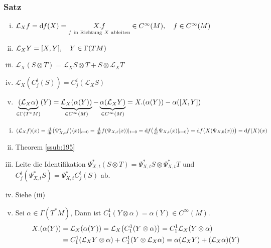 \subsubsection[Satz:Eigenschaften von $\mathcal{L}_X$]{Satz}
\label{ssub:186}
\begin{enumerate}[(i)]
\item $\mathcal{L}_X f = \mathrm{d}\mkern-1.0mu f(X) = \underset{f\text{ in Richtung }X\text{ ableiten}}{X. f} \in C^\infty(M),\quad f\in C^\infty (M)$
\item $\mathcal{L}_X Y = [X,Y],\quad Y\in \Gamma(TM)$
\item $\mathcal{L}_X (S\otimes T) = \mathcal{L}_X S \otimes T + S\otimes \mathcal{L}_X T$
\item $\mathcal{L}_X(C_j^i(S)) = C_j^i(\mathcal{L}_X S)$
\item $\underbrace{(\mathcal{L}_X \alpha)}_{\in \Gamma(T^* M)}(Y) = \underbrace{\mathcal{L}_X(\alpha(Y))}_{\in C^\infty (M)} - \underbrace{\alpha(\mathcal{L}_X Y)}_{\in C^\infty (M)} = X.(\alpha(Y)) - \alpha([X,Y])$
\end{enumerate}
\begin{enumerate}[(i)]
\item $\enbrace*{\mathcal{L}_X f}(x) = \frac{\mathd}{\mathd t}\enbrace*{\Psi_{X,t}^* f}(x)\vert_{t = 0} = \frac{\mathd}{\mathd t} f\enbrace*{\Psi_{X,t}(x)}\vert_{t = 0} = \mathd f\enbrace*{\frac{\mathd}{\mathd t} \Psi_{X,t}(x)\vert_{t = 0}} = \mathd f\enbrace[\big]{X\enbrace*{\Psi_{X,0}(x)}} = \mathd f(X)(x)$
\item Theorem \ref{ssub:195}
\item Leite die Identifikation $\Psi_{X,t}^*(S\otimes T) = \Psi_{X,t}^* S \otimes \Psi_{X,t}^* T$ und $C_j^i(\Psi_{X,t}^* S) = \Psi_{X,t}^* C_j^i(S)$ ab.
\item Siehe (iii)
\item Sei $\alpha\in \Gamma(T^* M)$, Dann ist $C_1^1(Y\otimes \alpha) = \alpha(Y) \in C^\infty (M)$.
\begin{align*}
X.(\alpha(Y)) &= \mathcal{L}_X (\alpha(Y)) =\mathcal{L}_X \enbrace*{C_1^1(Y\otimes \alpha)} = C_1^1 \mathcal{L}_X \enbrace{Y\otimes \alpha}\\
&= C_1^1 \enbrace{\mathcal{L}_X Y \otimes \alpha} + C_1^1\enbrace{Y\otimes \mathcal{L}_X \alpha} = \alpha(\mathcal{L}_X Y) + (\mathcal{L}_X \alpha)(Y)
\end{align*}
\end{enumerate}

